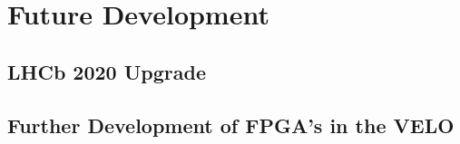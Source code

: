 \section{Future Development}

	\subsection{LHCb 2020 Upgrade}

	\subsection{Further Development of FPGA's in the VELO}

